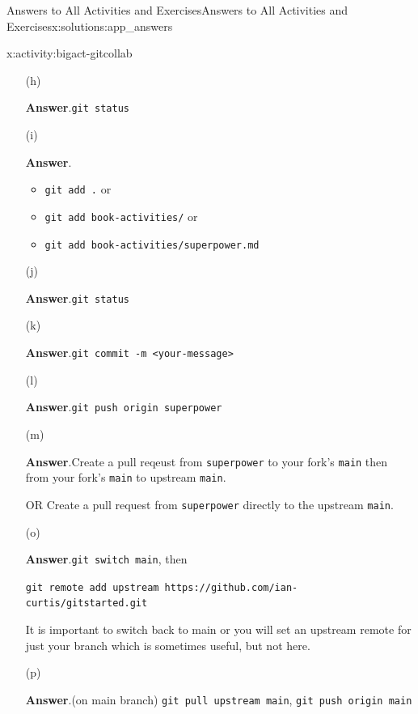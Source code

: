 \documentclass[oneside,10pt,]{book}
\newcommand{\blocktitlefont}{\relax}
\newcommand{\mono}[1]{\texttt{#1}}
\begin{document}
\begin{solutions-chapter}{Answers to All Activities and Exercises}{}{Answers to All Activities and Exercises}{}{}{x:solutions:app_answers}
\begin{activitysolution}{6.3}{}{x:activity:bigact-gitcollab}
\begin{enumerate}[font=\bfseries,label=(\alph*),ref=\alph*]
\item[(h)]\par\smallskip%
\noindent\textbf{\blocktitlefont Answer}.\hypertarget{g:answer:idp616852536-back}{}\quad{}\mono{git status}%
\item[(i)]\par\smallskip%
\noindent\textbf{\blocktitlefont Answer}.\hypertarget{g:answer:idp616857016-back}{}\quad{}%
\begin{itemize}[label=\textbullet]
\item{}\mono{git add .} or%
\item{}\mono{git add book-activities/} or%
\item{}\mono{git add book-activities/superpower.md}%
\end{itemize}
%
\item[(j)]\par\smallskip%
\noindent\textbf{\blocktitlefont Answer}.\hypertarget{g:answer:idp616861240-back}{}\quad{}\mono{git status}%
\item[(k)]\par\smallskip%
\noindent\textbf{\blocktitlefont Answer}.\hypertarget{g:answer:idp616856888-back}{}\quad{}\mono{git commit -m \textquotesingle{}<your-message>\textquotesingle{}}%
\item[(l)]\par\smallskip%
\noindent\textbf{\blocktitlefont Answer}.\hypertarget{g:answer:idp616868280-back}{}\quad{}\mono{git push origin superpower}%
\item[(m)]\par\smallskip%
\noindent\textbf{\blocktitlefont Answer}.\hypertarget{g:answer:idp616870712-back}{}\quad{}Create a pull reqeust from \mono{superpower} to your fork's \mono{main} then from your fork's \mono{main} to upstream \mono{main}.%
\par
OR Create a pull request from \mono{superpower} directly to the upstream \mono{main}.%
\item[(o)]\par\smallskip%
\noindent\textbf{\blocktitlefont Answer}.\hypertarget{g:answer:idp616863672-back}{}\quad{}\mono{git switch main}, then%
\par
\mono{git remote add upstream https://github.com/ian-curtis/gitstarted.git}%
\par
It is important to switch back to main or you will set an upstream remote for just your branch which is sometimes useful, but not here.%
\item[(p)]\par\smallskip%
\noindent\textbf{\blocktitlefont Answer}.\hypertarget{g:answer:idp616874424-back}{}\quad{}(on main branch) \mono{git pull upstream main}, \mono{git push origin main}%
\end{enumerate}
\end{activitysolution}%
\end{solutions-chapter}
\end{document}
